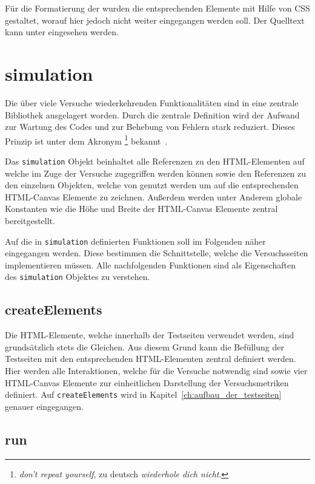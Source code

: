 Für die Formatierung der  wurden die entsprechenden Elemente mit Hilfe von CSS gestaltet, worauf hier jedoch nicht weiter eingegangen werden soll.
Der Quelltext kann unter  eingesehen werden.

\section{simulation}\label{ch:simulation_js}

Die über viele Versuche wiederkehrenden Funktionalitäten sind in eine zentrale Bibliothek ausgelagert worden.
Durch die zentrale Definition wird der Aufwand zur Wartung des Codes und zur Behebung von Fehlern stark reduziert.
Dieses Prinzip ist unter dem Akronym \footnote{\textit{don't repeat yourself}, zu deutsch \textit{wiederhole dich nicht}.} bekannt~\cite{AndrewHunt2021}.

Das \lstinline{simulation} Objekt beinhaltet alle Referenzen zu den HTML-Elementen auf welche im Zuge der Versuche zugegriffen werden können sowie den Referenzen zu den einzelnen  Objekten, welche von  genutzt werden um auf die entsprechenden HTML-Canvas Elemente zu zeichnen.
Au{\ss}erdem werden unter Anderem globale Konstanten wie die Höhe und Breite der HTML-Canvas Elemente zentral bereitgestellt.

Auf die in \lstinline{simulation} definierten Funktionen soll im Folgenden näher eingegangen werden.
Diese bestimmen die Schnittstelle, welche die Versuchsseiten implementieren müssen.
Alle nachfolgenden Funktionen sind als Eigenschaften des \lstinline{simulation} Objektes zu verstehen.

\subsection{createElements}\label{ch:sim_createElements}

Die HTML-Elemente, welche innerhalb der Testseiten verwendet werden, sind grundsätzlich stets die Gleichen.
Aus diesem Grund kann die Befüllung der Testseiten mit den entsprechenden HTML-Elementen zentral definiert werden.
Hier werden alle Interaktionen, welche für die Versuche notwendig sind sowie vier HTML-Canvas Elemente zur einheitlichen Darstellung der Versuchsmetriken definiert.
Auf \lstinline{createElements} wird in Kapitel~\ref{ch:aufbau_der_testseiten} genauer eingegangen.

\subsection{run}\label{ch:sim_run}

